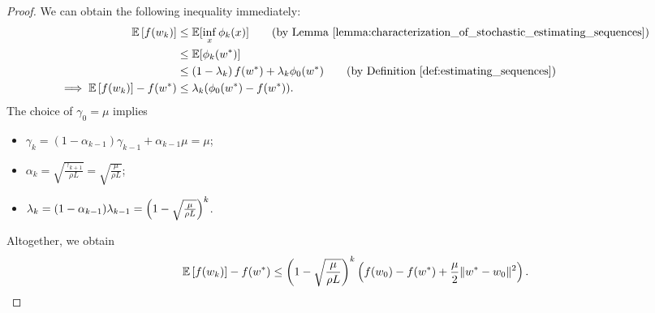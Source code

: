 \scAcceleratedRate*
\begin{proof}
    We can obtain the following inequality immediately:
    \begin{align*}
        \E\sbr{f(\wk)} &\leq \E[\inf_x \phi_k(x)] \tag{by Lemma~\ref{lemma:characterization_of_stochastic_estimating_sequences}}\\
        &\leq \E[\phi_k(\wopt)] \\
        &\leq \rbr{1 - \lambda_k} f(\wopt) + \lambda_k \phi_0(\wopt) \tag{by Definition~\ref{def:estimating_sequences}}\\
        \implies \E\sbr{f(\wk)} - f(\wopt) &\leq \lambda_k (\phi_0(\wopt) - f(\wopt)).
    \end{align*}
    The choice of \( \gamma_0 = \mu \) implies
    \begin{itemize}
        \item \(  \gamma_{k}  = (1 - \alpha_{k-1}) \gamma_{k-1} + \alpha_{k-1} \mu = \mu \);
        \item \( \alpha_{k} = \sqrt{\frac{\gamma_{k+1}}{\rho L}} = \sqrt{\frac{\mu}{\rho L}} \);
        \item \( \lambda_{k} = (1 - \alpha_{k-1}) \lambda_{k-1} = \left(1 - \sqrt{\frac{\mu}{\rho L}}\right)^{k} \).
    \end{itemize}
    Altogether, we obtain
    \[ \mathbb{E}\left[f(w_k)\right] - f(w^*) \leq \left(1 - \sqrt{\frac{\mu}{\rho L}}\right)^{k} \left( f(w_0) - f(w^*) + \frac{\mu}{2} \|w^* - w_0\|^2 \right). \]
\end{proof}
